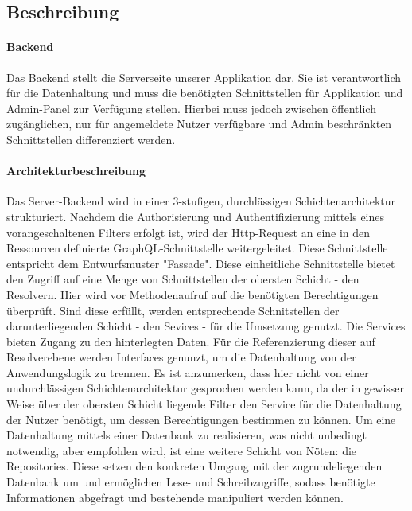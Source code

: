 \subsection{Beschreibung}%

\paragraph*{Backend}
Das \dq Backend \dq stellt die Serverseite unserer Applikation dar. Sie ist verantwortlich für die Datenhaltung und muss die benötigten Schnittstellen für Applikation und Admin-Panel zur Verfügung stellen.
 Hierbei muss jedoch zwischen öffentlich zugänglichen, nur für angemeldete Nutzer verfügbare und Admin beschränkten Schnittstellen differenziert werden.
\paragraph*{Architekturbeschreibung}
Das Server-Backend wird in einer 3-stufigen, durchlässigen Schichtenarchitektur strukturiert. Nachdem die Authorisierung und Authentifizierung
mittels eines vorangeschaltenen Filters erfolgt ist, wird der Http-Request an eine in den Ressourcen definierte GraphQL-Schnittstelle weitergeleitet. Diese Schnittstelle
entspricht dem Entwurfsmuster "Fassade". Diese einheitliche Schnittstelle bietet den Zugriff auf eine Menge von Schnittstellen der obersten Schicht - den Resolvern.
Hier wird vor Methodenaufruf auf die benötigten Berechtigungen überprüft. Sind diese erfüllt, werden entsprechende Schnitstellen der darunterliegenden Schicht - den Sevices - 
für die Umsetzung genutzt. Die Services bieten Zugang zu den hinterlegten Daten. Für die Referenzierung dieser auf Resolverebene werden Interfaces genunzt, um die Datenhaltung 
von der Anwendungslogik zu trennen. Es ist anzumerken, dass hier nicht von einer undurchlässigen Schichtenarchitektur gesprochen werden kann, da der in gewisser Weise
über der obersten Schicht liegende Filter den Service für die Datenhaltung der Nutzer benötigt, um dessen Berechtigungen bestimmen zu können.
Um eine Datenhaltung mittels einer Datenbank zu realisieren, was nicht unbedingt notwendig, aber empfohlen wird, ist eine weitere Schicht von Nöten: die Repositories.
Diese setzen den konkreten Umgang mit der zugrundeliegenden Datenbank um und ermöglichen Lese- und Schreibzugriffe, sodass benötigte Informationen abgefragt und bestehende manipuliert 
werden können.
 
